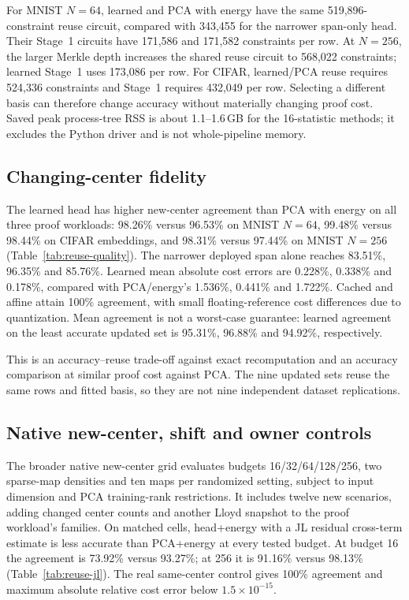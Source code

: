 For MNIST $N=64$, learned and PCA with energy have the same 519,896-constraint reuse circuit, compared with 343,455 for the narrower span-only head. Their Stage~1 circuits have 171,586 and 171,582 constraints per row. At $N=256$, the larger Merkle depth increases the shared reuse circuit to 568,022 constraints; learned Stage~1 uses 173,086 per row. For CIFAR, learned/PCA reuse requires 524,336 constraints and Stage~1 requires 432,049 per row. Selecting a different basis can therefore change accuracy without materially changing proof cost. Saved peak process-tree RSS is about 1.1--1.6\,GB for the 16-statistic methods; it excludes the Python driver and is not whole-pipeline memory.

\subsection{Changing-center fidelity}
The learned head has higher new-center agreement than PCA with energy on all three proof workloads: 98.26\% versus 96.53\% on MNIST $N=64$, 99.48\% versus 98.44\% on CIFAR embeddings, and 98.31\% versus 97.44\% on MNIST $N=256$ (Table~\ref{tab:reuse-quality}). The narrower deployed span alone reaches 83.51\%, 96.35\% and 85.76\%. Learned mean absolute cost errors are 0.228\%, 0.338\% and 0.178\%, compared with PCA/energy's 1.536\%, 0.441\% and 1.722\%. Cached and affine attain 100\% agreement, with small floating-reference cost differences due to quantization. Mean agreement is not a worst-case guarantee: learned agreement on the least accurate updated set is 95.31\%, 96.88\% and 94.92\%, respectively.

This is an accuracy--reuse trade-off against exact recomputation and an accuracy comparison at similar proof cost against PCA. The nine updated sets reuse the same rows and fitted basis, so they are not nine independent dataset replications.

\subsection{Native new-center, shift and owner controls}
The broader native new-center grid evaluates budgets 16/32/64/128/256, two sparse-map densities and ten maps per randomized setting, subject to input dimension and PCA training-rank restrictions. It includes twelve new scenarios, adding changed center counts and another Lloyd snapshot to the proof workload's families. On matched cells, head+energy with a JL residual cross-term estimate is less accurate than PCA+energy at every tested budget. At budget 16 the agreement is 73.92\% versus 93.27\%; at 256 it is 91.16\% versus 98.13\% (Table~\ref{tab:reuse-jl}). The real same-center control gives 100\% agreement and maximum absolute relative cost error below $1.5\times10^{-15}$.


